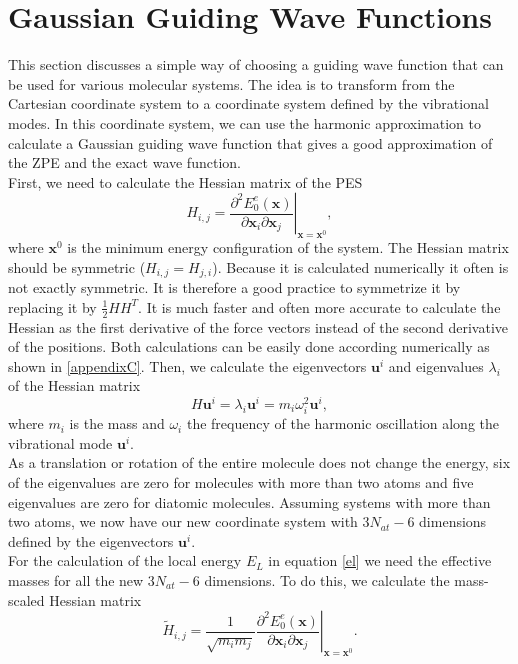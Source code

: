 \documentclass [12pt]{report}
\begin{document}
\section{Gaussian Guiding Wave Functions}
This section discusses a simple way of choosing a guiding wave function that can be used for various molecular systems. The idea is to transform from the Cartesian coordinate system to a coordinate system defined by the vibrational modes. In this coordinate system, we can use the harmonic approximation to calculate a Gaussian guiding wave function that gives a good approximation of the ZPE and the exact wave function.\\
First, we need to calculate the Hessian matrix of the PES
\begin{equation}
H_{i,j} = \left. \frac{\partial^2 E_0^e(\bm{x})}{\partial \bm{x}_i \partial \bm{x}_j }\right|_{\bm{x} = \bm{x}^0},
\end{equation}
where $\bm{x}^0$ is the minimum energy configuration of the system. The Hessian matrix should be symmetric ($H_{i,j} = H_{j,i}$). Because it is calculated numerically it often is not exactly symmetric. It is therefore a good practice to symmetrize it by replacing it by $\frac{1}{2} H H^T$. It is  much faster and often more accurate to calculate the Hessian as the first derivative of the force vectors instead of the second derivative of the positions. Both calculations can be easily done according numerically as shown in \ref{appendixC}.
Then, we calculate the eigenvectors $\bm{u}^i$ and  eigenvalues $\lambda_i$ of the Hessian matrix
\begin{equation} \label{eigs}
H \bm{u}^i = \lambda_i \bm{u}^i = m_i \omega_i^2 \bm{u}^i,
\end{equation}
where $m_i$ is the mass and $\omega_i$ the frequency of the harmonic oscillation along the vibrational mode $\bm{u}^i$.\\
As a translation or rotation of the entire molecule does not change the energy, six of the eigenvalues are zero for molecules with more than two atoms and five eigenvalues are zero for diatomic molecules. Assuming systems with more than two atoms, we now have our new coordinate system with $3 N_{at} - 6$ dimensions defined by the eigenvectors $\bm{u}^i$.\\
For the calculation of the local energy $E_L$ in equation \eqref{el} we need the effective masses for all the new $3 N_{at} - 6$ dimensions. To do this, we calculate the mass-scaled Hessian matrix
\begin{equation}
\tilde{H}_{i,j} = \left. \frac{1}{\sqrt{m_i m_j}}\frac{\partial^2 E_0^e(\bm{x})}{ \partial \bm{x}_i \partial \bm{x}_j }\right|_{\bm{x} = \bm{x}^0}.
\end{equation}
\end{document}
